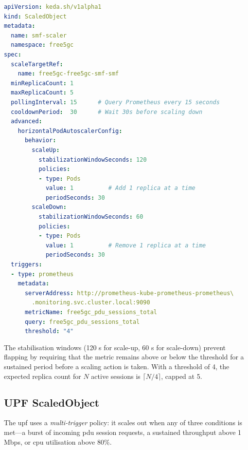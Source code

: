 \begin{lstlisting}[language=yaml, caption={KEDA ScaledObject for the SMF (smf-scaledobject-v2.yaml)}, label={lst:smf_scaledobject}]
apiVersion: keda.sh/v1alpha1
kind: ScaledObject
metadata:
  name: smf-scaler
  namespace: free5gc
spec:
  scaleTargetRef:
    name: free5gc-free5gc-smf-smf
  minReplicaCount: 1
  maxReplicaCount: 5
  pollingInterval: 15      # Query Prometheus every 15 seconds
  cooldownPeriod:  30      # Wait 30s before scaling down
  advanced:
    horizontalPodAutoscalerConfig:
      behavior:
        scaleUp:
          stabilizationWindowSeconds: 120
          policies:
          - type: Pods
            value: 1          # Add 1 replica at a time
            periodSeconds: 30
        scaleDown:
          stabilizationWindowSeconds: 60
          policies:
          - type: Pods
            value: 1          # Remove 1 replica at a time
            periodSeconds: 30
  triggers:
  - type: prometheus
    metadata:
      serverAddress: http://prometheus-kube-prometheus-prometheus\
        .monitoring.svc.cluster.local:9090
      metricName: free5gc_pdu_sessions_total
      query: free5gc_pdu_sessions_total
      threshold: "4"
\end{lstlisting}

The stabilisation windows (120 s for scale-up, 60 s for scale-down) prevent flapping by requiring that the metric remains above or below the threshold for a sustained period before a scaling action is taken. With a threshold of 4, the expected replica count for $N$ active sessions is $\lceil N/4 \rceil$, capped at 5.

\subsection{UPF ScaledObject}
\label{sec:upf_scaled}

The \gls{upf} uses a \emph{multi-trigger} policy: it scales out when any of three conditions is met—a burst of incoming \gls{pdu} session requests, a sustained throughput above 1 Mbps, or \gls{cpu} utilisation above 80\%.

